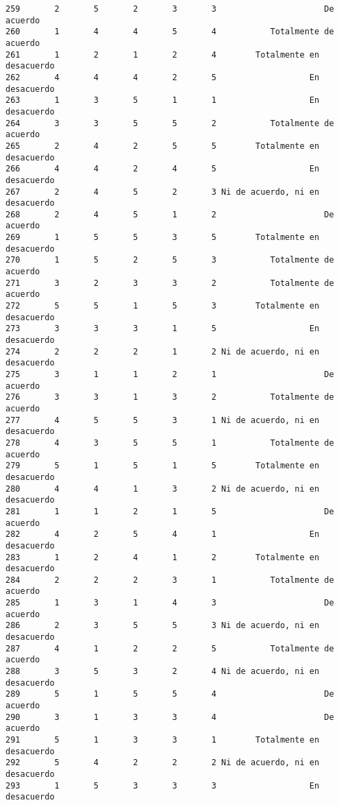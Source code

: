 \documentclass[
  letterpaper,
  DIV=11,
  numbers=noendperiod]{scrartcl}
\begin{document}
\begin{verbatim}
259       2       5       2       3       3                      De acuerdo
260       1       4       4       5       4           Totalmente de acuerdo
261       1       2       1       2       4        Totalmente en desacuerdo
262       4       4       4       2       5                   En desacuerdo
263       1       3       5       1       1                   En desacuerdo
264       3       3       5       5       2           Totalmente de acuerdo
265       2       4       2       5       5        Totalmente en desacuerdo
266       4       4       2       4       5                   En desacuerdo
267       2       4       5       2       3 Ni de acuerdo, ni en desacuerdo
268       2       4       5       1       2                      De acuerdo
269       1       5       5       3       5        Totalmente en desacuerdo
270       1       5       2       5       3           Totalmente de acuerdo
271       3       2       3       3       2           Totalmente de acuerdo
272       5       5       1       5       3        Totalmente en desacuerdo
273       3       3       3       1       5                   En desacuerdo
274       2       2       2       1       2 Ni de acuerdo, ni en desacuerdo
275       3       1       1       2       1                      De acuerdo
276       3       3       1       3       2           Totalmente de acuerdo
277       4       5       5       3       1 Ni de acuerdo, ni en desacuerdo
278       4       3       5       5       1           Totalmente de acuerdo
279       5       1       5       1       5        Totalmente en desacuerdo
280       4       4       1       3       2 Ni de acuerdo, ni en desacuerdo
281       1       1       2       1       5                      De acuerdo
282       4       2       5       4       1                   En desacuerdo
283       1       2       4       1       2        Totalmente en desacuerdo
284       2       2       2       3       1           Totalmente de acuerdo
285       1       3       1       4       3                      De acuerdo
286       2       3       5       5       3 Ni de acuerdo, ni en desacuerdo
287       4       1       2       2       5           Totalmente de acuerdo
288       3       5       3       2       4 Ni de acuerdo, ni en desacuerdo
289       5       1       5       5       4                      De acuerdo
290       3       1       3       3       4                      De acuerdo
291       5       1       3       3       1        Totalmente en desacuerdo
292       5       4       2       2       2 Ni de acuerdo, ni en desacuerdo
293       1       5       3       3       3                   En desacuerdo

\end{verbatim}
\end{document}
